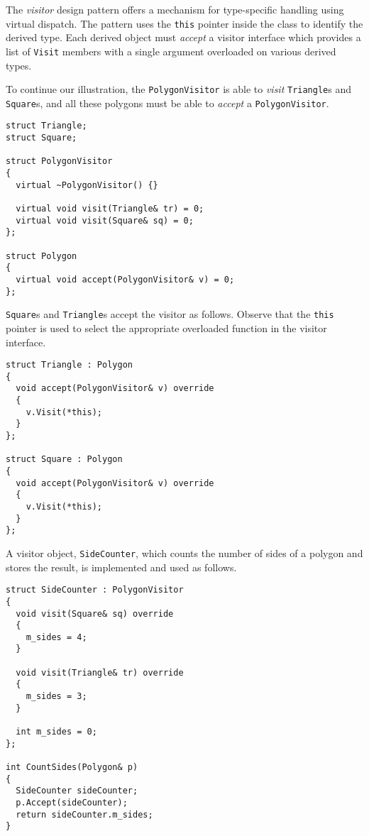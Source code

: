 \documentclass[10pt,a4paper]{article}
\newcommand\mycode[1]{{\small\texttt{#1}}}
\begin{document}
The \emph{visitor} design pattern offers a mechanism for type-specific handling
using virtual dispatch. The pattern uses the \mycode{this} pointer inside the
class to identify the derived type. Each derived object must \emph{accept} a
visitor interface which provides a list of \mycode{Visit} members with a single
argument overloaded on various derived types.

To continue our illustration, the \mycode{PolygonVisitor} is able to
\emph{visit} \mycode{Triangle}s and \mycode{Square}s, and all these polygons
must be able to \emph{accept} a \mycode{PolygonVisitor}.

{\small\begin{verbatim} 
struct Triangle; 
struct Square;

struct PolygonVisitor 
{ 
  virtual ~PolygonVisitor() {}

  virtual void visit(Triangle& tr) = 0; 
  virtual void visit(Square& sq) = 0;
};

struct Polygon 
{ 
  virtual void accept(PolygonVisitor& v) = 0; 
};\end{verbatim}}

\mycode{Square}s and \mycode{Triangle}s accept the visitor as follows. Observe
that the \mycode{this} pointer is used to select the appropriate overloaded
function in the visitor interface.

{\small\begin{verbatim} 
struct Triangle : Polygon 
{ 
  void accept(PolygonVisitor& v) override 
  { 
    v.Visit(*this); 
  } 
};

struct Square : Polygon 
{ 
  void accept(PolygonVisitor& v) override 
  {
    v.Visit(*this); 
  } 
};\end{verbatim}}

A visitor object, \mycode{SideCounter}, which counts the number of sides of a
polygon and stores the result, is implemented and used as follows.

{\small\begin{verbatim} 
struct SideCounter : PolygonVisitor 
{ 
  void visit(Square& sq) override 
  { 
    m_sides = 4; 
  }
  
  void visit(Triangle& tr) override 
  { 
    m_sides = 3; 
  }
  
  int m_sides = 0; 
};

int CountSides(Polygon& p) 
{ 
  SideCounter sideCounter; 
  p.Accept(sideCounter);
  return sideCounter.m_sides; 
}\end{verbatim}}

\newpage
\end{document}
